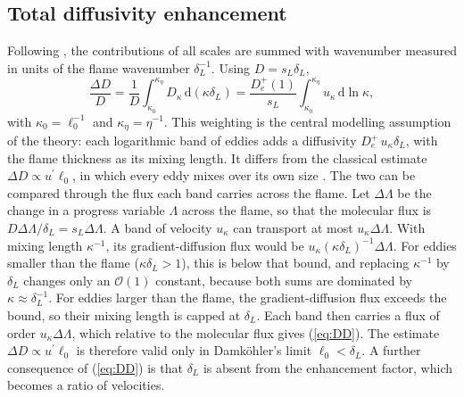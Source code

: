 \documentclass[lineno]{jfm}
\newcommand{\sL}{s_L}
\newcommand{\dL}{\delta_L}
\newcommand{\De}{D_e^{+}}
\newcommand{\up}{u^{\prime}}
\begin{document}
\subsection{Total diffusivity enhancement}

Following \citet{Nivarti2019}, the contributions of all scales are summed with wavenumber measured in units of the flame wavenumber $\dL^{-1}$. Using $D = \sL \dL$,
\begin{equation}
  \frac{\Delta D}{D} = \frac{1}{D} \int_{\kappa_0}^{\kappa_\eta} D_\kappa \, \mathrm{d}(\kappa \dL)
  = \frac{\De(1)}{\sL} \int_{\kappa_0}^{\kappa_\eta} u_\kappa \, \mathrm{d} \ln \kappa,
  \label{eq:DD}
\end{equation}
with $\kappa_0 = \ell_0^{-1}$ and $\kappa_\eta = \eta^{-1}$. This weighting is the central modelling assumption of the theory: each logarithmic band of eddies adds a diffusivity $\De \, u_\kappa \dL$, with the flame thickness as its mixing length. It differs from the classical estimate $\Delta D \propto \up \ell_0$, in which every eddy mixes over its own size \citep{Damkohler1940}. The two can be compared through the flux each band carries across the flame. Let $\Delta \Lambda$ be the change in a progress variable $\Lambda$ across the flame, so that the molecular flux is $D \Delta \Lambda / \dL = \sL \Delta \Lambda$. A band of velocity $u_\kappa$ can transport at most $u_\kappa \Delta \Lambda$. With mixing length $\kappa^{-1}$, its gradient-diffusion flux would be $u_\kappa(\kappa \dL)^{-1} \Delta \Lambda$. For eddies smaller than the flame ($\kappa \dL > 1$), this is below that bound, and replacing $\kappa^{-1}$ by $\dL$ changes only an $\mathcal{O}(1)$ constant, because both sums are dominated by $\kappa \approx \dL^{-1}$. For eddies larger than the flame, the gradient-diffusion flux exceeds the bound, so their mixing length is capped at $\dL$. Each band then carries a flux of order $u_\kappa \Delta \Lambda$, which relative to the molecular flux gives (\ref{eq:DD}). The estimate $\Delta D \propto \up \ell_0$ is therefore valid only in Damk\"ohler's limit $\ell_0 < \dL$. A further consequence of (\ref{eq:DD}) is that $\dL$ is absent from the enhancement factor, which becomes a ratio of velocities.
\end{document}
